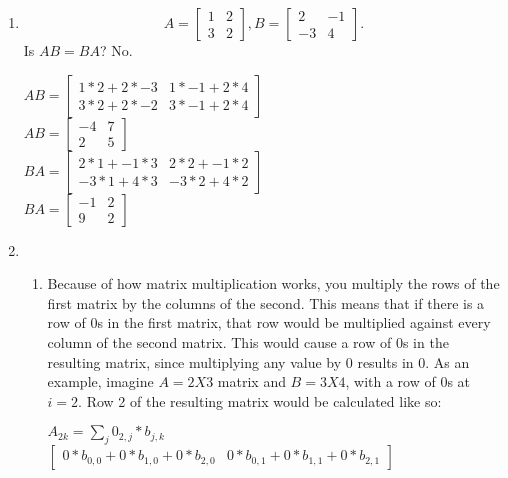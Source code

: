 \documentclass{article}
\begin{document}
\begin{enumerate}
\begin{enumerate}
            \end{enumerate}
        \item $$ A = \begin{bmatrix}1 & 2\\ 3 & 2\end{bmatrix}, B =  \begin{bmatrix}2 & -1\\ -3 & 4\end{bmatrix}.$$
        Is $AB = BA$?
        No.\\
        \begin{center}
            $AB =  \begin{bmatrix}1*2 + 2*-3 & 1*-1 + 2*4\\ 3*2 + 2*-2 & 3*-1 + 2*4\end{bmatrix}$\\
            $AB =  \begin{bmatrix}-4 & 7\\ 2 & 5\end{bmatrix}$\\
            $BA =  \begin{bmatrix}2*1 + -1*3 & 2*2 + -1*2\\ -3*1 + 4*3 & -3*2 + 4*2\end{bmatrix}$\\
            $BA =  \begin{bmatrix}-1 & 2\\ 9 & 2\end{bmatrix}$
        \end{center}
        \item
        \begin{enumerate}
            \item Because of how matrix multiplication works, you multiply the rows of the first matrix by the columns of the
            second. This means that if there is a row of 0s in the first matrix, that row would be multiplied against every 
            column of the second matrix. This would cause a row of 0s in the resulting matrix, since multiplying any value
            by 0 results in 0. As an example, imagine $A = 2 X 3$ matrix and $B = 3 X 4$, with a row of 0s at $i = 2$. Row 2 
            of the resulting matrix would be calculated like so:
            \begin{center}
                $A_{2k} = \sum_{j} 0_{2,j} * b_{j,k}$\\
                $\begin{bmatrix}0*b_{0,0} + 0*b_{1,0} + 0*b_{2,0} & 0*b_{0,1} + 0*b_{1,1} + 0*b_{2,1}\end{bmatrix}$\\

\end{center}
\end{enumerate}
\end{enumerate}
\end{document}
